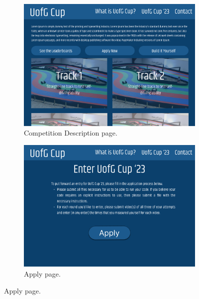 \documentclass{l4proj}
\begin{document}
\begin{appendices}
\begin{figure}
    \begin{subfigure}{0.49\textwidth}
        \centering
        \includegraphics[width=\textwidth]{images/UofG Cup '23.pdf}
        \caption{Competition Description page.}
        \label{fig:web-comp-desc-page}  
    \end{subfigure}
    \begin{subfigure}{0.49\textwidth}
        \centering
        \includegraphics[width=\textwidth]{images/Apply.pdf}
        \caption{Apply page.}
        \label{fig:web-apply-page}  
    \end{subfigure}


\end{figure}
\end{appendices}
\end{document}

